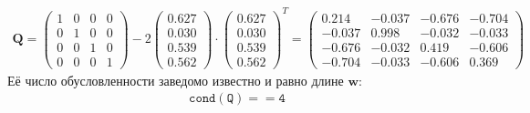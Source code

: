 \begin{align}
    \mathbf{Q} =
    \begin{pmatrix}
        1 & 0 & 0 & 0 \\
        0 & 1 & 0 & 0 \\
        0 & 0 & 1 & 0 \\
        0 & 0 & 0 & 1
    \end{pmatrix} - 2
    \begin{pmatrix}
        0.627 \\
        0.030 \\
        0.539 \\
        0.562
    \end{pmatrix} \cdot
    \begin{pmatrix}
        0.627 \\
        0.030 \\
        0.539 \\
        0.562
    \end{pmatrix} ^T =
    \begin{pmatrix}
        0.214 & -0.037 &  -0.676 &  -0.704 \\
        -0.037 &   0.998 & -0.032 & -0.033 \\
        -0.676 & -0.032  &  0.419 &  -0.606 \\
        -0.704 & -0.033  & -0.606  &   0.369
    \end{pmatrix}
\end{align}
Её число обусловленности заведомо известно и равно длине $\mathbf{w}$:
\begin{align}
    \mathtt{cond(Q) == 4}
\end{align}

